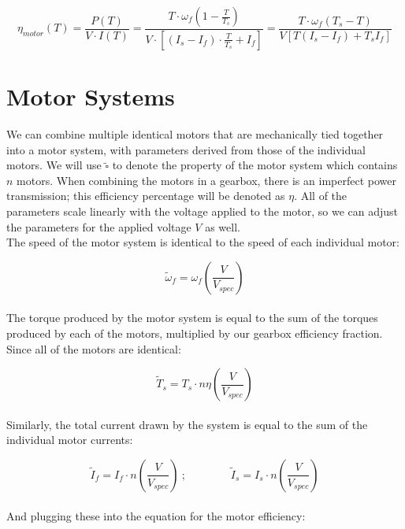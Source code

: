 \documentclass[a4paper]{article}
\begin{document}
	\begin{equation}
		\eta_{motor} (T) = \frac{P(T)}{V \cdot I (T)}
		= \frac{T \cdot \omega_f \left( 1 - \frac{T}{T_s} \right)}{V \cdot \left[ \left( I_s - I_f \right) \cdot \frac{T}{T_s} + I_f \right]}
		= \frac{T \cdot \omega_f \left( T_s - T \right)}{V \left[ T \left( I_s - I_f \right) + T_s I_f \right]}
	\end{equation}
	
	
	\section*{Motor Systems}
	
	We can combine multiple identical motors that are mechanically tied together into a motor system, with parameters derived from those of the individual motors. We will use $ \widetilde{\square} $ to denote the property of the motor system which contains $ n $ motors. When combining the motors in a gearbox, there is an imperfect power transmission; this efficiency percentage will be denoted as $ \eta $. All of the parameters scale linearly with the voltage applied to the motor, so we can adjust the parameters for the applied voltage $ V $ as well. \\
	
	The speed of the motor system is identical to the speed of each individual motor:
	
	\begin{equation}
		\widetilde{\omega}_f = \omega_f \left( \frac{V}{V_{spec}} \right)
	\end{equation}
	\\
	The torque produced by the motor system is equal to the sum of the torques produced by each of the motors, multiplied by our gearbox efficiency fraction. Since all of the motors are identical:
	
	\begin{equation}
		\widetilde{T}_s = T_s \cdot n \eta \left( \frac{V}{V_{spec}} \right)
	\end{equation}
	\\
	Similarly, the total current drawn by the system is equal to the sum of the individual motor currents:
	
	\begin{equation}
		\widetilde{I}_f = I_f \cdot n \left( \frac{V}{V_{spec}} \right)\ ; \qquad\qquad \widetilde{I}_s = I_s \cdot n \left( \frac{V}{V_{spec}} \right)
	\end{equation}
	\\
	And plugging these into the equation for the motor efficiency:
	
\end{document}

